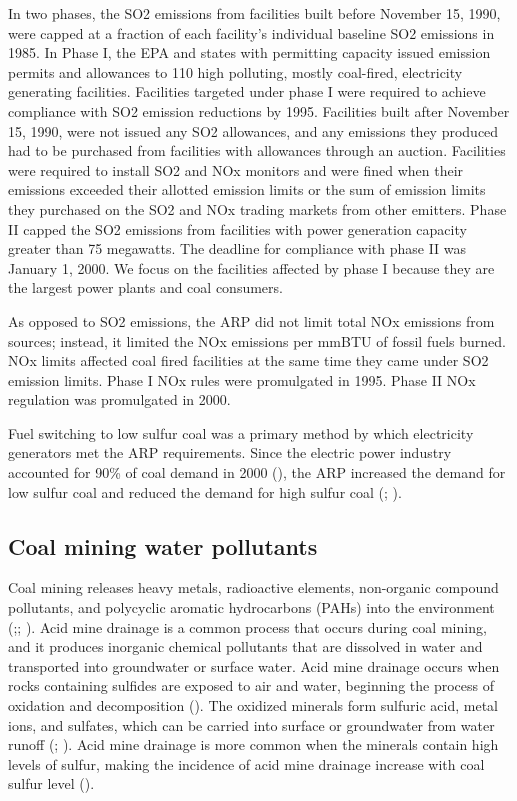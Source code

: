 \documentclass{article}
\begin{document}
In two phases, the SO2 emissions from facilities built before November 15, 1990, were capped at a fraction of each facility's individual baseline SO2 emissions in 1985. In Phase I, the EPA and states with permitting capacity issued emission permits and allowances to 110 high polluting, mostly coal-fired, electricity generating facilities. Facilities targeted under phase I were required to achieve compliance with SO2 emission reductions by 1995. Facilities built after November 15, 1990, were not issued any SO2 allowances, and any emissions they produced had to be purchased from facilities with allowances through an auction. Facilities were required to install SO2 and NOx monitors and were fined when their emissions exceeded their allotted emission limits or the sum of emission limits they purchased on the SO2 and NOx trading markets from other emitters. Phase II capped the SO2 emissions from facilities with power generation capacity greater than 75 megawatts. The deadline for compliance with phase II was January 1, 2000. We focus on the facilities affected by phase I because they are the largest power plants and coal consumers.

As opposed to SO2 emissions, the ARP did not limit total NOx emissions from sources; instead, it limited the NOx emissions per mmBTU of fossil fuels burned. NOx limits affected coal fired facilities at the same time they came under SO2 emission limits. Phase I NOx rules were promulgated in 1995. Phase II NOx regulation was promulgated in 2000.

Fuel switching to low sulfur coal was a primary method by which electricity generators met the ARP requirements. Since the electric power industry accounted for 90\% of coal demand in 2000 (\cite{freme2000us}), the ARP increased the demand for low sulfur coal and reduced the demand for high sulfur coal (\cite{epaarpcoalemp}; \cite{stratford2015coalprod}). 

\subsection{Coal mining water pollutants}

Coal mining releases heavy metals, radioactive elements, non-organic compound pollutants, and polycyclic aromatic hydrocarbons (PAHs) into the environment (\cite{rouhani2023overview};\cite{boente2020benzo}; \cite{liang2017spatial}). Acid mine drainage is a common process that occurs during coal mining, and it produces inorganic chemical pollutants that are dissolved in water and transported into groundwater or surface water. Acid mine drainage occurs when rocks containing sulfides are exposed to air and water, beginning the process of oxidation and decomposition (\cite{ceto2000abandoned}). The oxidized minerals form sulfuric acid, metal ions, and sulfates, which can be carried into surface or groundwater from water runoff (\cite{akcil2006acid}; \cite{skousen2019acid}). Acid mine drainage is more common when the minerals contain high levels of sulfur, making the incidence of acid mine drainage increase with coal sulfur level (\cite{schweinfurth2009introduction}).
\end{document}
